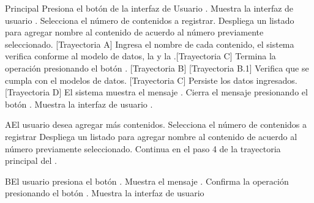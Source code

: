 \begin{UCtrayectoria}{Principal}
    \UCpaso[\UCactor] Presiona el botón  de la interfaz de Usuario .
    \UCpaso Muestra la interfaz de usuario .
    \UCpaso[\UCactor] Selecciona el número de contenidos a registrar.
    \UCpaso Despliega un listado para agregar nombre al contenido de acuerdo al número previamente seleccionado. [Trayectoria A]
    \UCpaso[\UCactor] Ingresa el nombre de cada contenido, el sistema verifica conforme al modelo de datos, la  y la .[Trayectoria C]
	\UCpaso[\UCactor] Termina la operación presionando el botón . [Trayectoria B] [Trayectoria B.1]
	\UCpaso Verifica que se cumpla con el modelos de datos. [Trayectoria C]
	\UCpaso Persiste los datos ingresados. [Trayectoria D]
	\UCpaso El sistema muestra el mensaje .
	\UCpaso[\UCactor] Cierra el mensaje presionando el botón .
	\UCpaso Muestra la interfaz de usuario .
\end{UCtrayectoria}


\begin{UCtrayectoriaA}{A}{El usuario desea agregar más contenidos.}
    \UCpaso[\UCactor] Selecciona el número de contenidos a registrar
    \UCpaso Despliega un listado para agregar nombre al contenido de acuerdo al número previamente seleccionado.
    \UCpaso Continua en el paso 4 de la trayectoria principal del .

\end{UCtrayectoriaA}

\begin{UCtrayectoriaA}{B}{El usuario presiona el botón .}
	\UCpaso Muestra el mensaje .
	\UCpaso[\UCactor] Confirma la operación presionando el botón .
	\UCpaso Muestra la interfaz de usuario 
\end{UCtrayectoriaA}

